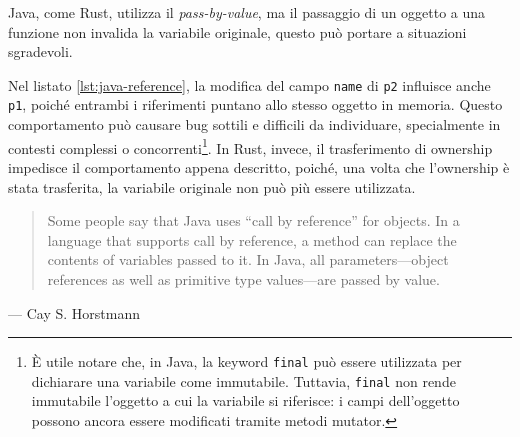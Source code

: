 Java, come Rust, utilizza il \textit{pass-by-value}, ma il passaggio di un oggetto a una funzione non invalida la variabile originale, questo può portare a situazioni sgradevoli.
Nel listato \ref{lst:java-reference}, la modifica del campo \texttt{name} di \texttt{p2} influisce anche \texttt{p1}, poiché entrambi i riferimenti puntano allo stesso oggetto in memoria. Questo comportamento può causare bug sottili e difficili da individuare, specialmente in contesti complessi o concorrenti\footnote{È utile notare che, in Java, la keyword \texttt{final} può essere utilizzata per dichiarare una variabile come immutabile. Tuttavia, \texttt{final} non rende immutabile l'oggetto a cui la variabile si riferisce: i campi dell'oggetto possono ancora essere modificati tramite metodi mutator.}. In Rust, invece, il trasferimento di ownership impedisce il comportamento appena descritto, poiché, una volta che l'ownership è stata trasferita, la variabile originale non può più essere utilizzata.

\begin{quote}
    Some people say that Java uses “call by reference” for objects. In a language that supports call by reference, a method can replace the contents of variables passed to it. In Java, all parameters—object references as well as primitive type values—are passed by value.
\end{quote}
\begin{flushright}
--- Cay S. Horstmann \cite{horstmann-java-impatient}
\end{flushright}

